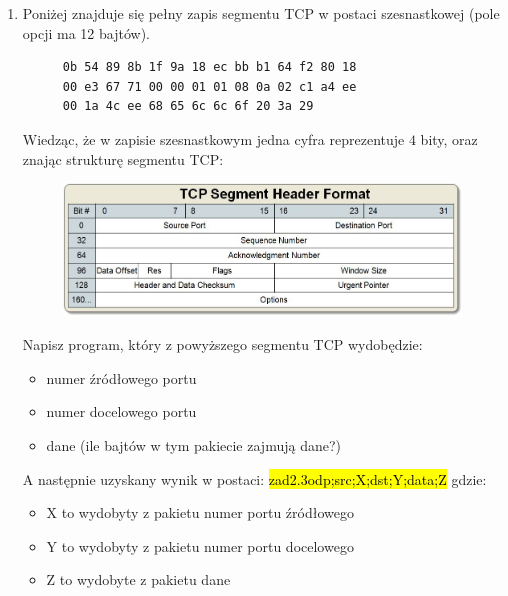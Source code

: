 \documentclass{article}
\newcommand{\hlc}[2][shadecolor]{ 	{\sethlcolor{#1} \hl{#2}} }
\begin{document}
\begin{enumerate}[label=\textbf{2.\arabic*}]
 \item \label{ex22} Poniżej znajduje się pełny zapis segmentu TCP w postaci szesnastkowej (pole opcji ma 12 bajtów). \\ 

\begin{figure}[h!t!p!]
\centering
\begin{BVerbatim}
0b 54 89 8b 1f 9a 18 ec bb b1 64 f2 80 18
00 e3 67 71 00 00 01 01 08 0a 02 c1 a4 ee 
00 1a 4c ee 68 65 6c 6c 6f 20 3a 29
\end{BVerbatim}
\end{figure}\mbox{}

\noindent  Wiedząc, że w zapisie szesnastkowym jedna cyfra reprezentuje $4$ bity, oraz znając strukturę segmentu TCP:\\

\begin{figure}[ht!]
\centering
\includegraphics[scale=0.45]{./ch2/tcp.png}
\end{figure}
\newpage 
\noindent Napisz program, który z powyższego segmentu TCP wydobędzie: 

\begin{itemize}
\item numer źródłowego portu
\item numer docelowego portu
\item dane (ile bajtów w tym pakiecie zajmują dane?)
\end{itemize}

\noindent A następnie uzyskany wynik w postaci: \hlc[shadecolor]{ zad2.3odp;src;X;dst;Y;data;Z } gdzie:

\begin{itemize}
\item X to wydobyty z pakietu numer portu źródłowego
\item Y to wydobyty z pakietu numer portu docelowego
\item Z to wydobyte z pakietu dane 
\end{itemize}


\end{enumerate}
\end{document}

